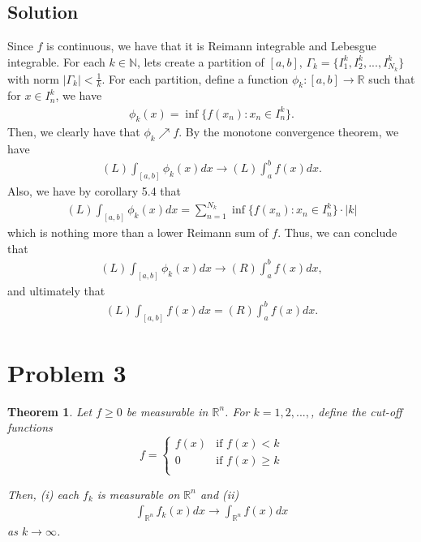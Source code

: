 \documentclass[10pt,a4paper]{article}
\theoremstyle{theorem}
\newtheorem{theorem}{Theorem}
\theoremstyle{definition}
\begin{document}
\subsection*{Solution}
Since $f$ is continuous, we have that it is Reimann integrable and Lebesgue integrable. For each $k \in \mathbb{N}$, lets create a partition of $[a, b]$, $\Gamma_k = \{I^k_1, I^k_2,...,I^k_{N_k} \}$ with norm $|\Gamma_k| <\frac{1}{k}$. For each partition, define a function $\phi_k: [a, b] \to \mathbb{R}$ such that for $x \in I^k_n$, we have
\begin{align*}
\phi_k(x) = \inf \{f(x_n): x_n \in I^k_n\}.
\end{align*}
Then, we clearly have that $\phi_k \nearrow f$. By the monotone convergence theorem, we have
\begin{align*}
(L) \int_{[a, b]} \phi_k(x)dx \to (L) \int_a^b f(x)dx.
\end{align*}
Also, we have by corollary 5.4 that
\begin{align*}
(L) \int_{[a, b]} \phi_k(x)dx = \sum_{n = 1}^{N_k} \inf \{f(x_n): x_n \in I^k_n\} \cdot |k|
\end{align*}
which is nothing more than a lower Reimann sum of $f$. Thus, we can conclude that 
\begin{align*}
(L) \int_{[a, b]} \phi_k(x)dx \to (R) \int_a^b f(x)dx,
\end{align*}
and ultimately that
\begin{align*}
(L) \int_{[a, b]} f(x) dx = (R) \int_a^b f(x)dx.
\end{align*}

\section*{Problem 3}
\begin{theorem}
Let $f \geq 0$ be measurable in $\mathbb{R}^n$. For $k=1,2,...,$, define the cut-off functions 
\[   f = \left\{
\begin{array}{ll}
      f(x) & \text{if } f(x)<k \\
      0 & \text{if } f(x) \geq k\\
\end{array} 
\right. \]

Then, (i) each $f_k$ is measurable on $\mathbb{R}^n$ and (ii)
\begin{align*}
\int_{\mathbb{R}^n} f_k(x)dx \to \int_{\mathbb{R}^n} f(x)dx
\end{align*}
as $k \to \infty$.
\end{theorem}
\end{document}
